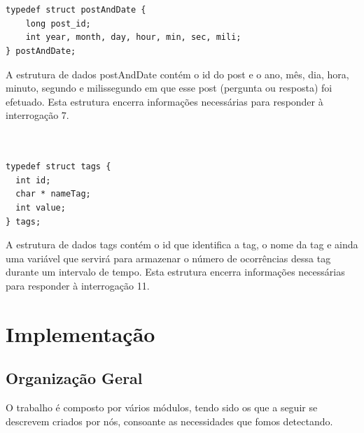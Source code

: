 \documentclass[a4paper]{report}
\begin{document}
\begin{verbatim}


typedef struct postAndDate {
    long post_id;
    int year, month, day, hour, min, sec, mili;
} postAndDate;

\end{verbatim}

A estrutura de dados postAndDate contém o id do post e o ano, mês, dia,
hora, minuto, segundo e milissegundo em que esse post
(pergunta ou resposta) foi efetuado. Esta estrutura encerra informações
necessárias para responder à interrogação 7.

\begin{verbatim}


typedef struct tags {
  int id;
  char * nameTag;
  int value;
} tags;

\end{verbatim}

A estrutura de dados tags contém o id que identifica a tag,
o nome da tag e ainda uma variável que servirá para armazenar
o número de ocorrências dessa tag durante um intervalo de tempo.
Esta estrutura encerra informações necessárias para responder à interrogação 11.


\chapter{Implementação}
\label{ch:implementacao}

\section{Organização Geral}
\label{sec:organizacao}

O trabalho é composto por vários módulos, tendo sido os que a seguir se descrevem
criados por nós, consoante as necessidades que fomos detectando.
\end{document}
